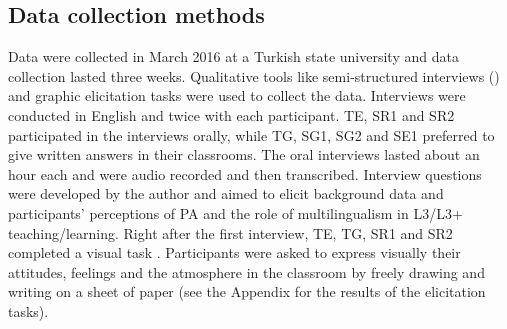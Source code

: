 \documentclass[output=paper]{../langscibook}
\begin{document}
\begin{table}
\end{table}



\subsection{Data collection methods}



Data were collected in March 2016 at a Turkish state university and data collection lasted three weeks. Qualitative tools like semi-structured interviews (\citealt{FraenkleWallen2009}) and graphic elicitation tasks \citep{Bagnoli2009} were used to collect the data. Interviews were conducted in English and twice with each participant. TE, SR1 and SR2 participated in the interviews orally, while TG, SG1, SG2 and SE1 preferred to give written answers in their classrooms. The oral interviews lasted about an hour each and were audio recorded and then transcribed. Interview questions were developed by the author and aimed to elicit background data and participants’ perceptions of PA and the role of multilingualism in L3/L3+ teaching/learning.  Right after the first interview, TE, TG, SR1 and SR2 completed a visual task \citep{Bagnoli2009}. Participants were asked to express visually their attitudes, feelings and the atmosphere in the classroom by freely drawing and writing on a sheet of paper (see the Appendix for the results of the elicitation tasks).
\end{document}
